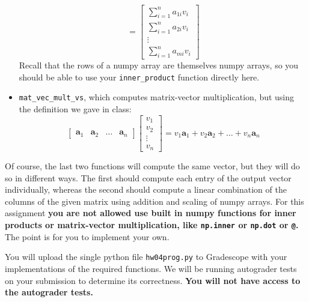 \documentclass{article}
\theoremstyle{remark}
\begin{document}
\begin{itemize}
\begin{displaymath}
    =
    \begin{bmatrix}
      \sum_{i = 1}^n a_{1i} v_i \\
      \sum_{i = 1}^n a_{2i} v_i \\
      \vdots \\
      \sum_{i = 1}^n a_{mi} v_i
    \end{bmatrix}
  \end{displaymath}
  Recall that the rows of a numpy array are themselves numpy arrays, so you should be able to use your \texttt{inner\_product} function directly here.
\item \texttt{mat\_vec\_mult\_vs}, which computes matrix-vector multiplication, but using the definition we gave in class:
  \begin{displaymath}
    \begin{bmatrix}
      \mathbf a_1 & \mathbf a_2 & \dots & \mathbf a_n
    \end{bmatrix}
    \begin{bmatrix}
      v_1 \\ v_2 \\ \vdots \\ v_n
    \end{bmatrix}
    =
    v_1\mathbf a_1 + v_2 \mathbf a_2 + \dots + v_n \mathbf a_n
  \end{displaymath}
\end{itemize}

Of course, the last two functions will compute the same vector, but they will do so in different ways.
The first should compute each entry of the output vector individually, whereas the second should compute a linear combination of the columns of the given matrix using addition and scaling of numpy arrays.
For this assignment \textbf{you are not allowed use built in numpy functions for inner products or matrix-vector multiplication, like \texttt{np.inner} or \texttt{np.dot} or \texttt{@}.}
The point is for you to implement your own.

You will upload the single python file \texttt{hw04prog.py} to Gradescope with your implementations of the required functions.
We will be running autograder tests on your submission to determine its correctness.
\textbf{You will not have access to the autograder tests.}
\end{document}
